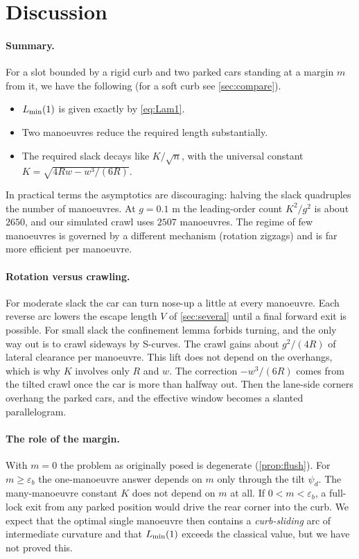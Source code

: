 \section{Discussion}\label{sec:discussion}

\paragraph{Summary.}
For a slot bounded by a rigid curb and two parked cars standing at a margin $m$ from it, we have the following (for a soft curb see \cref{sec:compare}).
\begin{itemize}[nosep]
\item $L_{\min}(1)$ is given exactly by \eqref{eq:Lam1}.
\item Two manoeuvres reduce the required length substantially.
\item The required slack decays like $K/\sqrt n$, with the universal constant $K=\sqrt{4Rw-w^3/(6R)}$.
\end{itemize}
In practical terms the asymptotics are discouraging: halving the slack quadruples the number of manoeuvres.
At $g=0.1$ m the leading-order count $K^2/g^2$ is about $2650$, and our simulated crawl uses $2507$ manoeuvres.
The regime of few manoeuvres is governed by a different mechanism (rotation zigzags) and is far more efficient per manoeuvre.

\paragraph{Rotation versus crawling.}
For moderate slack the car can turn nose-up a little at every manoeuvre.
Each reverse arc lowers the escape length $V$ of \cref{sec:several} until a final forward exit is possible.
For small slack the confinement lemma forbids turning, and the only way out is to crawl sideways by S-curves.
The crawl gains about $g^2/(4R)$ of lateral clearance per manoeuvre.
This lift does not depend on the overhangs, which is why $K$ involves only $R$ and $w$.
The correction $-w^3/(6R)$ comes from the tilted crawl once the car is more than halfway out.
Then the lane-side corners overhang the parked cars, and the effective window becomes a slanted parallelogram.

\paragraph{The role of the margin.}
With $m=0$ the problem as originally posed is degenerate (\cref{prop:flush}).
For $m\ge\varepsilon_b$ the one-manoeuvre answer depends on $m$ only through the tilt $\psi_d$.
The many-manoeuvre constant $K$ does not depend on $m$ at all.
If $0<m<\varepsilon_b$, a full-lock exit from any parked position would drive the rear corner into the curb.
We expect that the optimal single manoeuvre then contains a \emph{curb-sliding} arc of intermediate curvature and that $L_{\min}(1)$ exceeds the classical value, but we have not proved this.

